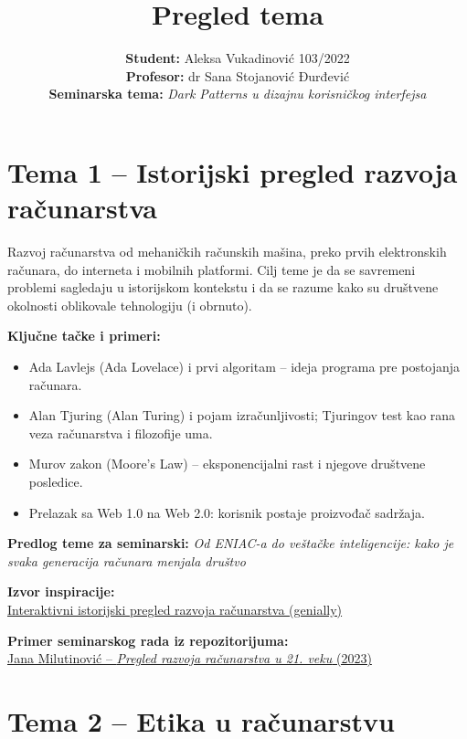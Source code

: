 \documentclass[12pt,a4paper]{article}
\title{\bf Pregled tema}
\author{
    {\bf Student:} Aleksa Vukadinović \quad {\bf Indeks:} 103/2022 \\[0.3cm]
    {\bf Profesor:} dr Sana Stojanović Đurđević \\[0.3cm]
    {\bf Seminarska tema:} \emph{Dark Patterns u dizajnu korisničkog interfejsa}
}
\date{}
\begin{document}
\maketitle
\newpage

\tableofcontents
\newpage

\section{Tema 1 -- Istorijski pregled razvoja računarstva}

Razvoj računarstva od mehaničkih računskih mašina, preko prvih elektronskih računara,
do interneta i mobilnih platformi. Cilj teme je da se savremeni problemi sagledaju u
istorijskom kontekstu i da se razume kako su društvene okolnosti oblikovale tehnologiju
(i obrnuto).

\textbf{Ključne tačke i primeri:}
\begin{itemize}
    \item Ada Lavlejs (Ada Lovelace) i prvi algoritam -- ideja programa pre postojanja
          računara.
    \item Alan Tjuring (Alan Turing) i pojam izračunljivosti; Tjuringov test kao rana
          veza računarstva i filozofije uma.
    \item Murov zakon (Moore's Law) -- eksponencijalni rast i njegove društvene posledice.
    \item Prelazak sa Web 1.0 na Web 2.0: korisnik postaje proizvođač sadržaja.
\end{itemize}

\textbf{Predlog teme za seminarski:}
\emph{Od ENIAC-a do veštačke inteligencije: kako je svaka generacija računara menjala
društvo}

\textbf{Izvor inspiracije:}\\
\href{https://view.genial.ly/62213fa1797ddc00194500dc/interactive-content-chronological-line}%
{Interaktivni istorijski pregled razvoja računarstva (genially)}

\textbf{Primer seminarskog rada iz repozitorijuma:}\\
\href{https://github.com/sanastojanovic/RID/blob/main/rid_2023_seminarski/mi22448_Jana_Milutinovic/racunarstvo_21_vek.pdf.pdf}%
{Jana Milutinović -- \emph{Pregled razvoja računarstva u 21. veku} (2023)}

\section{Tema 2 -- Etika u računarstvu}
\end{document}
